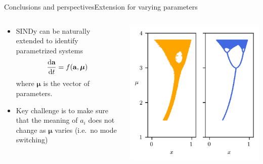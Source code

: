 \documentclass[usenames,dvipsnames,svgnames,10pt,aspectratio=169]{beamer}
\begin{document}
\begin{frame}[t, c]{Conclusions and perspectives}{Extension for varying parameters}
	\begin{columns}
		\begin{column}{.6\textwidth}
			\begin{itemize}
				\item SINDy can be naturally extended to identify parametrized systems
				\begin{equation}
					\displaystyle \frac{\mathrm{d}{\bf a}}{\mathrm{d}t} = f({\bf a}, {\boldsymbol \mu})
					\notag
				\end{equation}
				where ${\boldsymbol \mu}$ is the vector of parameters.

				\bigskip

				\item Key challenge is to make sure that the meaning of $a_i$ does not change as ${\boldsymbol \mu}$ varies (i.e.\ no mode switching)
			\end{itemize}
			\vspace{1cm}
		\end{column}
		\begin{column}{.4\textwidth}
			\centering
			\includegraphics[width=.9\textwidth]{logistic_eq}
		\end{column}
	\end{columns}
\end{frame}
\end{document}
